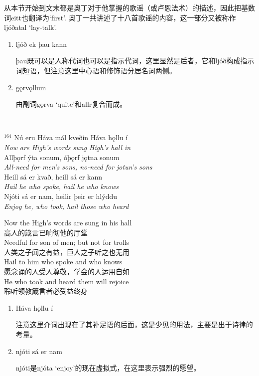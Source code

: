 \begin{grammar*}{}
    从本节开始到文末都是奥丁对于他掌握的歌谣（或卢恩法术）的描述，因此把基数词eitt也翻译为`first'. 奥丁一共讲述了十八首歌谣的内容，这一部分又被称作ljóðatal `lay-talk'.
    \begin{enumerate}[leftmargin=*]
        \item ljóð ek þau kann

              þau既可以是人称代词也可以是指示代词，这里显然是后者，它和ljóð构成指示词短语，但注意这里中心语和修饰语分居名词两侧。

        \item gǫrvǫllum

              由副词gǫrva `quite'和allr复合而成。
    \end{enumerate}
\end{grammar*}
\hspace*{\fill}\\ %
\begin{paracol}{2}
    \noindent
    $^{164}$ Nú eru Háva mál kveðin Háva hǫllu í\\
    \textit{Now are High's words sung High's hall in}\\
    Allþǫrf ýta sonum, óþǫrf jǫtna sonum\\
    \textit{All-need for men's sons, no-need for jotun's sons}\\
    Heill sá er kvað, heill sá er kann\\
    \textit{Hail he who spoke, hail he who knows}\\
    Njóti sá er nam, heilir þeir er hlýddu\\
    \textit{Enjoy he, who took, hail those who heard }\\
    \switchcolumn

    \noindent
    Now the High's words are sung in his hall\\
    高人的箴言已响彻他的厅堂\\
    Needful for son of men; but not for trolls\\
    人类之子闻之有益，巨人之子听之也无用\\
    Hail to him who spoke and who knows\\
    愿念诵的人受人尊敬，学会的人运用自如\\
    He who took and heard them will rejoice\\
    聆听领教箴言者必受益终身\\

\end{paracol}

\begin{grammar*}{}
    \begin{enumerate}[leftmargin=*]
        \item Háva hǫllu í

              注意这里介词出现在了其补足语的后面，这是少见的用法，主要是出于诗律的考量。

        \item njóti sá er nam

              njóti是njóta `enjoy'的现在虚拟式，在这里表示强烈的愿望。

    \end{enumerate}
\end{grammar*}
\hspace*{\fill}\\ %